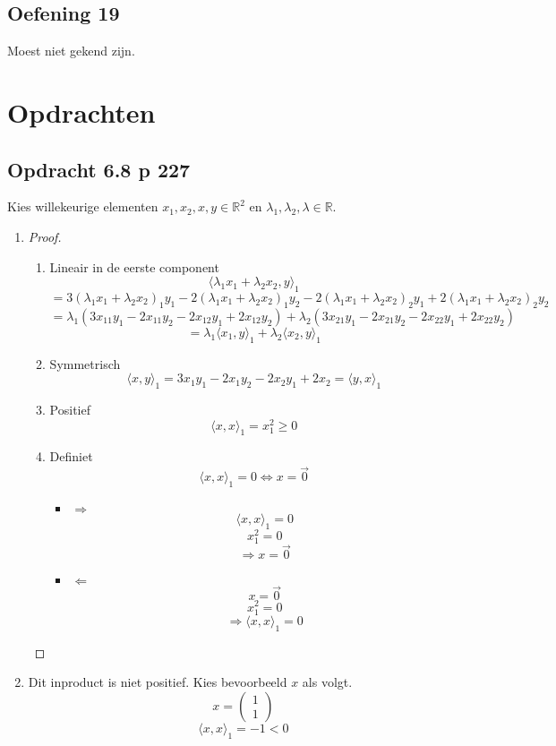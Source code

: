 \documentclass[lineaire_algebra_oplossingen.tex]{subfiles}
\begin{document}
\subsection{Oefening 19}
Moest niet gekend zijn.


\section{Opdrachten}

\subsection{Opdracht 6.8 p 227}
\label{6.8}
Kies willekeurige elementen $x_1,x_2,x,y \in \mathbb{R}^{2}$ en $\lambda_1,\lambda_2,\lambda \in \mathbb{R}$.
\begin{enumerate}
\item
\begin{proof}
\begin{enumerate}
\item Lineair in de eerste component
\[
\langle \lambda_1x_1 + \lambda_2x_2,y \rangle_1
\]
\[
= 3(\lambda_1x_1 + \lambda_2x_2)_1y_1 - 2(\lambda_1x_1 + \lambda_2x_2)_1y_2-2(\lambda_1x_1 + \lambda_2x_2)_2y_1+2(\lambda_1x_1 + \lambda_2x_2)_2y_2
\]
\[
= \lambda_1(3x_{11}y_1-2x_{11}y_2-2x_{12}y_1+2x_{12}y_2) + \lambda_2(3x_{21}y_1-2x_{21}y_2-2x_{22}y_1+2x_{22}y_2)
\]
\[
= \lambda_1\langle x_1,y \rangle_1
+  \lambda_2\langle x_2,y \rangle_1
\]

\item Symmetrisch
\[
\langle x , y \rangle_1
=
3x_{1}y_1-2x_{1}y_2-2x_{2}y_1+2x_{2}
= \langle y , x \rangle_1
\]

\item Positief
\[
\langle x,x \rangle_1  = x_1^2\ge 0
\]

\item Definiet
\[
\langle x,x \rangle_1 = 0 \Leftrightarrow x= \vec{0}
\]

\begin{itemize}
\item $\Rightarrow$
\[
\langle x,x \rangle_1 = 0 
\]
\[
x_1^2=0
\]
\[
\Rightarrow x= \vec{0}
\]

\item $\Leftarrow$
\[
x= \vec{0}
\]
\[
x_1^2=0
\]
\[
 \Rightarrow \langle x,x \rangle_1 = 0
\]
\end{itemize}
\end{enumerate}
\end{proof}

\item
Dit inproduct is niet positief. 
Kies bevoorbeeld $x$ als volgt.
\[
x = 
\begin{pmatrix}
1\\1
\end{pmatrix}
\]
\[
\langle x,x \rangle_1 = -1 <0
\]
\end{enumerate}
\end{document}
